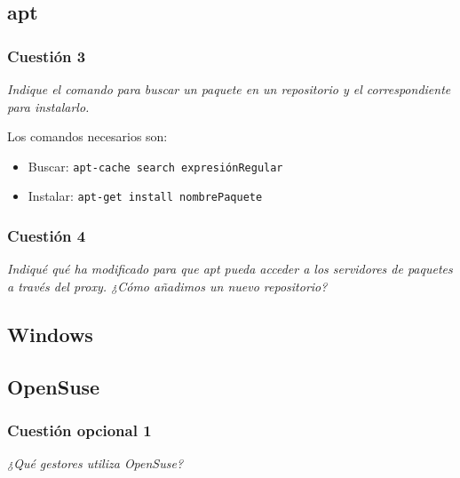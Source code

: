 \subsection{apt}

\subsubsection{Cuestión 3}
\textit{Indique el comando para buscar un paquete en un repositorio y el correspondiente para instalarlo.}
\newline

Los comandos necesarios son: \cite{manapt1} \cite{manapt2}
\begin{itemize}
  \item Buscar: \texttt{apt-cache search expresiónRegular }
  \item Instalar: \texttt{apt-get install nombrePaquete}
\end{itemize}




\subsubsection{Cuestión 4}
\textit{Indiqué qué ha modificado para que apt pueda acceder a los servidores de paquetes a través del proxy. ¿Cómo añadimos un nuevo repositorio?}
\newline


\subsection{Windows}





\subsection{OpenSuse}
\subsubsection{Cuestión opcional 1}
\textit{¿Qué gestores utiliza OpenSuse?}
\newline
 
